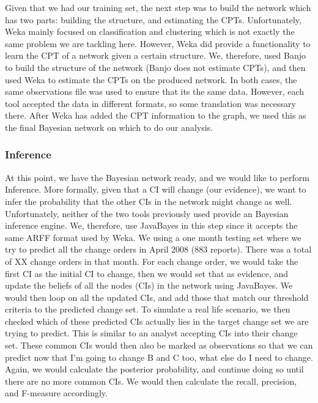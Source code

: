 \documentclass{article}
\begin{document}
Given that we had our training set, the next step was to build the network which has two parts: building the structure, and estimating the CPTs. Unfortunately,
Weka mainly focused on classification and clustering which is not exactly the same problem we are tackling here. However, Weka did provide a functionality to
learn the CPT of a network given a certain structure. We, therefore, used Banjo to build the structure of the network (Banjo does not estimate CPTs), and then
used Weka to estimate the CPTs on the produced network. In both cases, the same observations file was used to ensure that its the same data. However, each tool
accepted the data in different formats, so some translation was necessary there. After Weka has added the CPT information to the graph, we used this as the
final Bayesian network on which to do our analysis.

\subsubsection*{Inference}

At this point, we have the Bayesian network ready, and we would like to perform Inference. More formally, given that a CI will change (our evidence), we want
to infer the probability that the other CIs in the network might change as well. Unfortunately, neither of the two tools previously used provide an Bayesian
inference engine. We, therefore, use JavaBayes in this step since it accepts the same ARFF format used by Weka. We using a one month testing set where we try
to predict all the change orders in April 2008 (883 reports). There was a total of XX change orders in that month. For each change order, we would take the
first CI as the initial CI to change, then we would set that as evidence, and update the beliefs of all the nodes (CIs) in the network using JavaBayes. We would
then loop on all the updated CIs, and add those that match our threshold criteria to the predicted change set. To simulate a real life scenario, we then checked
which of these predicted CIs actually lies in the target change set we are trying to predict. This is similar to an analyst accepting CIs into their change set.
These common CIs would then also be marked as observations so that we can predict now that I'm going to change B and C too, what else do I need to change.
Again, we would calculate the posterior probability, and continue doing so until there are no more common CIs. We would then calculate the recall, precision,
and F-measure accordingly.
\end{document}
